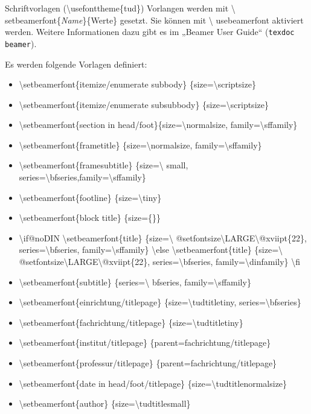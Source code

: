 \documentclass[presentation,t]{beamer}
\begin{document}
\begin{frame}[allowframebreaks,label=sec-2-3-3]{Schriftvorlagen (\textbackslash usefonttheme\{tud\})}
Vorlangen werden mit \textbackslash
setbeamerfont\{\emph{Name}\}\{Werte\} gesetzt. Sie können mit \textbackslash
usebeamerfont aktiviert werden. Weitere Informationen dazu gibt es im
„Beamer User Guide“ (\texttt{texdoc beamer}).

Es werden folgende Vorlagen definiert:
\begin{itemize}
\item \textbackslash setbeamerfont\{itemize/enumerate subbody\} \{size=\textbackslash scriptsize\}
\item \textbackslash setbeamerfont\{itemize/enumerate subsubbody\} \{size=\textbackslash scriptsize\}
\item \textbackslash setbeamerfont\{section in head/foot\}\{size=\textbackslash normalsize, family=\textbackslash sffamily\}
\item \textbackslash setbeamerfont\{frametitle\} \{size=\textbackslash normalsize, family=\textbackslash sffamily\}
\item \textbackslash setbeamerfont\{framesubtitle\} \{size=\textbackslash
   small, series=\textbackslash bfseries,family=\textbackslash sffamily\}
\item \textbackslash setbeamerfont\{footline\} \{size=\textbackslash tiny\}
\item \textbackslash setbeamerfont\{block title\} \{size=\{\}\}
\item \textbackslash if@noDIN
  \textbackslash setbeamerfont\{title\} \{size=\textbackslash
 @setfontsize\textbackslash LARGE\textbackslash @xviipt\{22\},
 series=\textbackslash bfseries, family=\textbackslash sffamily\}
\textbackslash else
  \textbackslash setbeamerfont\{title\} \{size=\textbackslash
 @setfontsize\textbackslash LARGE\textbackslash @xviipt\{22\},
 series=\textbackslash bfseries, family=\textbackslash dinfamily\}
\textbackslash fi
\item \textbackslash setbeamerfont\{subtitle\} \{series=\textbackslash
   bfseries, family=\textbackslash sffamily\}
\item \textbackslash setbeamerfont\{einrichtung/titlepage\}
\{size=\textbackslash tudtitletiny, series=\textbackslash bfseries\}
\item \textbackslash setbeamerfont\{fachrichtung/titlepage\} \{size=\textbackslash tudtitletiny\}
\item \textbackslash setbeamerfont\{institut/titlepage\} \{parent=fachrichtung/titlepage\}
\item \textbackslash setbeamerfont\{professur/titlepage\} \{parent=fachrichtung/titlepage\}
\item \textbackslash setbeamerfont\{date in head/foot/titlepage\} \{size=\textbackslash tudtitlenormalsize\}
\item \textbackslash setbeamerfont\{author\} \{size=\textbackslash tudtitlesmall\}
\end{itemize}
\end{frame}
\end{document}
